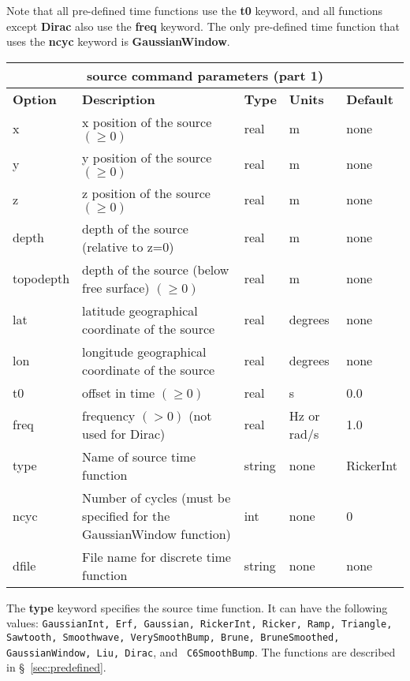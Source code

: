 \documentclass[11pt]{report}
\begin{document}
Note that all pre-defined time functions use the {\bf t0} keyword, and all functions except {\bf
  Dirac} also use the {\bf freq} keyword. The only pre-defined time function that uses the {\bf
  ncyc} keyword is {\bf GaussianWindow}.
%
\begin{center}
\begin{tabular}{|l|p{8cm}|l|l|l|} \hline
\multicolumn{5}{|c|}{\bf source command parameters (part 1)}\\ \hline
\bf{Option} & \bf{Description} & \bf{Type} & \bf{Units} & \bf{Default} \\ \hline \hline
x & x position of the source $(\geq 0)$ & real & m & none \\ \hline
y & y position of the source $(\geq 0)$ & real & m & none \\ \hline
z & z position of the source $(\geq 0)$ & real & m & none \\ \hline
\hline
depth & depth of the source (relative to z=0) & real & m & none \\ \hline
topodepth & depth of the source (below free surface) $(\geq 0)$ & real & m & none \\ \hline
lat & latitude geographical coordinate of the source & real & degrees & none \\ \hline
lon & longitude geographical coordinate of the source & real & degrees & none \\ \hline
\hline
t0 & offset in time $(\geq 0)$ & real & s & 0.0 \\ \hline
freq & frequency $(>0)$ (not used for Dirac)& real & Hz or rad/s & 1.0 \\ \hline
type & Name of source time function & string & none & RickerInt \\ \hline
ncyc & Number of cycles (must be specified for the GaussianWindow function) & int & none & 0
\\ \hline
dfile & File name for discrete time function & string & none & none \\ \hline
\end{tabular}
\end{center}
  The {\bf type} keyword specifies the source time function. It can have
the following values: {\tt GaussianInt, Erf, Gaussian, RickerInt, Ricker, Ramp, Triangle, Sawtooth,
  Smoothwave, VerySmoothBump, Brune, BruneSmoothed, GaussianWindow, Liu, Dirac}, and {\tt
  C6SmoothBump}. The functions are described in \S~\ref{sec:predefined}.  
\end{document}
